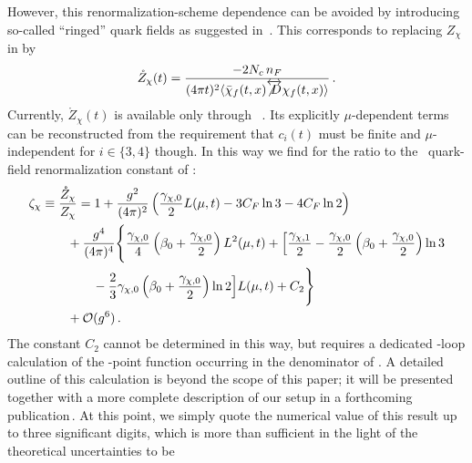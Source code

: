 However, this renormalization-scheme dependence can be avoided by
introducing so-called ``ringed'' quark fields as suggested
in~. This corresponds to replacing $Z_\chi$ in
 by
\begin{equation}
  \begin{split}
    \mathring{Z}_\chi(t) = \frac{-2 N_c \, n_F}{(4 \pi t)^2
      \langle\bar{\chi}_f(t,x)\overleftrightarrow
      {\slashed D}\chi_f(t,x)\rangle}\,.
    \label{eq:zf}
  \end{split}
\end{equation}
Currently, $\mathring{Z}_\chi(t)$ is available only through \nlo\ \qcd.
Its explicitly $\mu$-dependent terms can be reconstructed from the
requirement that $c_i(t)$ must be finite and $\mu$-independent for $i\in
\{3,4\}$ though. In this way we find for the ratio to the
\msbar\ quark-field renormalization constant of :
\begin{equation}
	\begin{split}
	  \zeta_\chi&\equiv \frac{\mathring{Z}_\chi}{Z_\chi} = 1 + \gcoup{2}
          \left( \frac{\gamma_{\chi, 0}}{2} L(\mu ,t) - 3 C_F \ln 3 - 4
          C_F \ln 2 \right) \\ &
                \qquad + \gcoup{4} \Bigg\{
                  \frac{\gamma_{\chi, 0}}{4} \left( \beta_0 +
                  \frac{\gamma_{\chi, 0}}{2} \right) L^2 (\mu, t) +
                  \Big[ \frac{\gamma_{\chi, 1}}{2} -
                  \frac{\gamma_{\chi, 0}}{2} \left( \beta_0 +
                  \frac{\gamma_{\chi, 0}}{2} \right) \ln 3 \\
                & \qquad \qquad -
                  \frac{2}{3}
                  \gamma_{\chi, 0} \left(
                  \beta_0 + \frac{\gamma_{\chi, 0}}{2}\right) \ln 2
                  \Big] L(\mu,t)
                  + C_2 \Bigg\} \\ &\qquad + \order{g^6} \,.
                \label{eq:zfchi}
	\end{split}
\end{equation}
The constant $C_2$ cannot be determined in this way, but requires a
dedicated \three-loop calculation of the \two-point function occurring
in the denominator of . A detailed outline of this
calculation is beyond the scope of this paper; it will be presented
together with a more complete description of our setup in a forthcoming
publication\,\cite{Artz:2019bpr}. At this point, we simply quote the
numerical value of this result up to three significant digits, which is
more than sufficient in the light of the theoretical uncertainties to be
